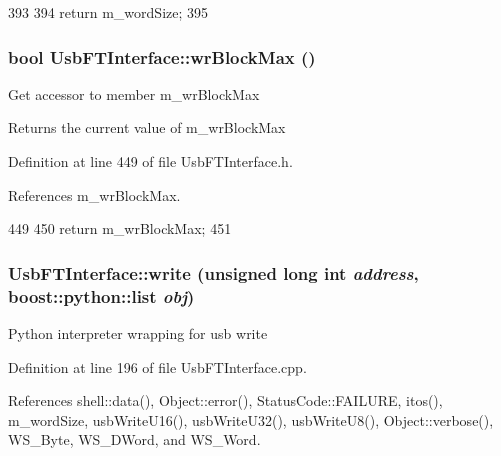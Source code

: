 \begin{DoxyCode}
393                             {
394     return m_wordSize;
395   }  
\end{DoxyCode}
\hypertarget{classUsbFTInterface_ad73d2d990fdda96ee53566daaeb73abc}{
\subsubsection[{wrBlockMax}]{\setlength{\rightskip}{0pt plus 5cm}bool UsbFTInterface::wrBlockMax ()}}
\label{classUsbFTInterface_ad73d2d990fdda96ee53566daaeb73abc}
Get accessor to member m\_\-wrBlockMax \begin{DoxyReturn}{Returns}
the current value of m\_\-wrBlockMax 
\end{DoxyReturn}


Definition at line 449 of file UsbFTInterface.h.

References m\_\-wrBlockMax.


\begin{DoxyCode}
449                      {
450     return m_wrBlockMax;
451   }
\end{DoxyCode}
\hypertarget{classUsbFTInterface_a2efbde3a31cdbe44a3cbd66da6592870}{
\subsubsection[{write}]{ UsbFTInterface::write (unsigned long int {\em address}, \/  boost::python::list {\em obj})}}
\label{classUsbFTInterface_a2efbde3a31cdbe44a3cbd66da6592870}
Python interpreter wrapping for usb write 

Definition at line 196 of file UsbFTInterface.cpp.

References shell::data(), Object::error(), StatusCode::FAILURE, itos(), m\_\-wordSize, usbWriteU16(), usbWriteU32(), usbWriteU8(), Object::verbose(), WS\_\-Byte, WS\_\-DWord, and WS\_\-Word.


